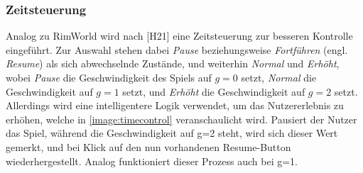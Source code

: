 \subsubsection{Zeitsteuerung}
Analog zu RimWorld wird nach [H21] eine Zeitsteuerung zur besseren Kontrolle eingeführt. Zur Auswahl stehen dabei \textit{Pause} beziehungsweise \textit{Fortführen} (engl. \textit{Resume}) als sich abwechselnde Zustände, und weiterhin \textit{Normal} und \textit{Erhöht}, wobei \textit{Pause} die Geschwindigkeit des Spiels auf $g=0$ setzt, \textit{Normal} die Geschwindigkeit auf $g=1$ setzt, und \textit{Erhöht} die Geschwindigkeit auf $g=2$ setzt. Allerdings wird eine intelligentere Logik verwendet, um das Nutzererlebnis zu erhöhen, welche in \autoref{image:timecontrol} veranschaulicht wird. Pausiert der Nutzer das Spiel, während die Geschwindigkeit auf g=2 steht, wird sich dieser Wert gemerkt, und bei Klick auf den nun vorhandenen Resume-Button wiederhergestellt. Analog funktioniert dieser Prozess auch bei g=1.

